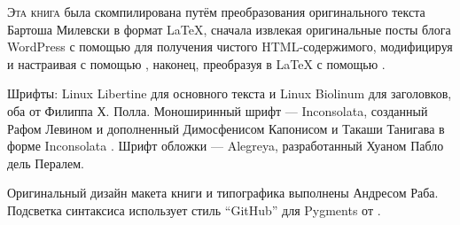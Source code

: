 \lettrine[lraise=-0.03,loversize=0.08]{Э}{та книга} была скомпилирована  путём преобразования оригинального текста Бартоша Милевски в формат \LaTeX{},
сначала извлекая оригинальные посты блога WordPress с помощью 
для получения чистого HTML-содержимого, модифицируя и настраивая с помощью ,
наконец, преобразуя в \LaTeX{} с помощью .

Шрифты: Linux Libertine для основного текста и Linux Biolinum для заголовков, оба от Филиппа Х. Полла. Моноширинный шрифт — Inconsolata,
созданный Рафом Левином и дополненный Димосфенисом Капонисом и Такаши Танигава в форме Inconsolata . Шрифт обложки —
Alegreya, разработанный Хуаном Пабло дель Пералем.

Оригинальный дизайн макета книги и типографика выполнены Андресом Раба. Подсветка синтаксиса использует стиль ``GitHub'' для Pygments от
.
\ifdefined\OPTCustomLanguage{%
    
  }
\fi
